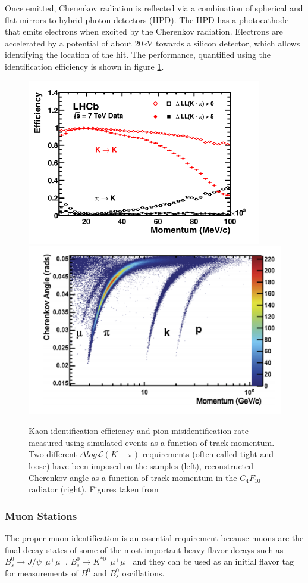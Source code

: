 Once emitted, Cherenkov radiation is reflected via a combination of spherical and flat mirrors to hybrid photon detectors (HPD). The HPD has a photocathode that emits electrons when excited by the Cherenkov radiation. Electrons are accelerated by a potential of about 20kV towards a silicon detector, which allows identifying the location of the hit. The performance, quantified using the identification efficiency is shown in figure \ref{fig:RICH_performance}. 


\begin{figure}[h]
 \begin{center}
  \includegraphics[width=0.49\linewidth]{figures/Kaon_proton.PNG}
   \includegraphics[width=0.49\linewidth]{figures/Chernkov_angle.PNG}
    \caption{Kaon identification efficiency and pion misidentification rate measured using simulated events as a function of track momentum. Two different $\Delta log \mathcal{L}(K − \pi)$ requirements (often called tight and loose) have been imposed on the
samples (left), reconstructed Cherenkov angle as a function of track momentum in the $C_4F_{10}$ radiator (right). Figures taken from \cite{RICH_performance}}%
    \label{fig:RICH_performance}%
 \end{center}
\end{figure}


\subsubsection{Muon Stations}

The proper muon identification is an essential requirement because muons are the final decay states of some of the most important heavy flavor decays such as $B_s^0 \rightarrow J/\psi ~~ \mu^{+}\mu^{-}$,  $B^{0}_s \rightarrow K^{*0} ~~ \mu^{+}\mu^{-}$ and they can be used as an initial flavor tag for measurements of $B^0$  and $B^0_{s}$ oscillations. 

